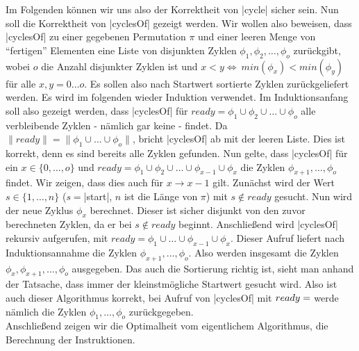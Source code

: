 Im Folgenden können wir uns also der Korrektheit von |cycle| sicher sein. Nun soll die Korrektheit von |cyclesOf| gezeigt werden.
Wir wollen also beweisen, dass |cyclesOf| zu einer gegebenen Permutation $\pi$ und einer leeren Menge von ``fertigen'' Elementen eine Liste
von disjunkten Zyklen $\phi_1, \phi_2, \dots, \phi_o$ zurückgibt, wobei $o$ die Anzahl disjunkter Zyklen ist und $x < y \Leftrightarrow \ min(\phi_x) < min(\phi_y)$ für alle $x,y=0 \dots o$.
Es sollen also nach Startwert sortierte Zyklen zurückgeliefert werden.
Es wird im folgenden wieder Induktion verwendet.
Im Induktionsanfang soll also gezeigt werden, dass |cyclesOf| für $ready = \phi_1 \cup \phi_2 \cup \dots \cup \phi_o$ alle verbleibende Zyklen - nämlich gar keine - findet.
Da $\|ready\| = \|\phi_1 \cup \dots \cup \phi_o\|$, bricht |cyclesOf| ab mit der leeren Liste. Dies ist korrekt, denn es sind bereits alle Zyklen gefunden.
Nun gelte, dass |cyclesOf| für ein $x \in \{0, \dots, o\}$ und $ready = \phi_1 \cup \phi_2 \cup \dots \cup \phi_{x-1} \cup \phi_x$ die Zyklen $\phi_{x+1}, \dots, \phi_o$ findet.
Wir zeigen, dass dies auch für $x \rightarrow x-1$ gilt.
Zunächst wird der Wert $s \in \{1, \dots, n\}$ ($s=$|start|, $n$ ist die Länge von $\pi$) mit $s \notin ready$ gesucht.
Nun wird der neue Zyklus $\phi_x$ berechnet. Dieser ist sicher disjunkt von den zuvor berechneten Zyklen, da er bei $s \notin ready$ beginnt.
Anschließend wird |cyclesOf| rekursiv aufgerufen, mit $ready = \phi_1 \cup \dots \cup \phi_{x-1} \cup \phi_{x}$.
Dieser Aufruf liefert nach Induktionsannahme die Zyklen $\phi_{x+1}, \dots, \phi_o$.
Also werden insgesamt die Zyklen $\phi_{x}, \phi_{x+1}, \dots, \phi_o$ ausgegeben.
Das auch die Sortierung richtig ist, sieht man anhand der Tatsache, dass immer der kleinstmögliche Startwert gesucht wird.
Also ist auch dieser Algorithmus korrekt, bei Aufruf von |cyclesOf| mit $ready = \empty$ werde nämlich die Zyklen $\phi_1, \dots, \phi_o$ zurückgegeben.\\

Anschließend zeigen wir die Optimalheit vom eigentlichem Algorithmus, die Berechnung der Instruktionen.

